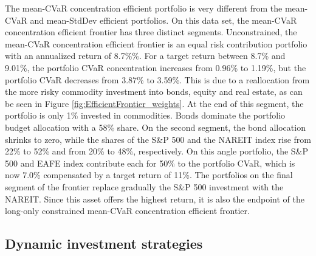 \documentclass[12pt,a4paper]{article}
\begin{document}

The mean-CVaR concentration efficient portfolio is very different from the mean-CVaR and mean-StdDev efficient portfolios. On this data set, the mean-CVaR concentration efficient frontier has three distinct segments. Unconstrained, the mean-CVaR concentration efficient frontier is an equal risk contribution portfolio with an annualized return of 8.7\%\%. For a target return between 8.7\% and 9.01\%, the portfolio CVaR concentration increases from 0.96\% to 1.19\%, but the portfolio CVaR decreases from 3.87\% to 3.59\%. This is due to a reallocation from the more risky commodity investment into bonds, equity and real estate, as can be seen in Figure \ref{fig:EfficientFrontier_weights}. At the end of this segment, the portfolio is only 1\% invested in commodities. Bonds dominate the portfolio budget allocation with a 58\% share. On the second segment, the bond allocation shrinks to zero, while the shares of the S\&P 500 and the NAREIT index rise from 22\% to 52\% and from 20\% to 48\%, respectively. On this angle portfolio, the S\&P 500 and EAFE index contribute each for 50\% to the portfolio CVaR, which is now 7.0\% compensated by a target return of 11\%. The portfolios on the final segment of the frontier replace gradually the S\&P 500 investment with the NAREIT. Since this asset offers the highest return, it is also the endpoint of the long-only constrained mean-CVaR concentration efficient frontier.

\clearpage

\subsection{Dynamic investment strategies}\label{subsec:dynamic}
\end{document}
